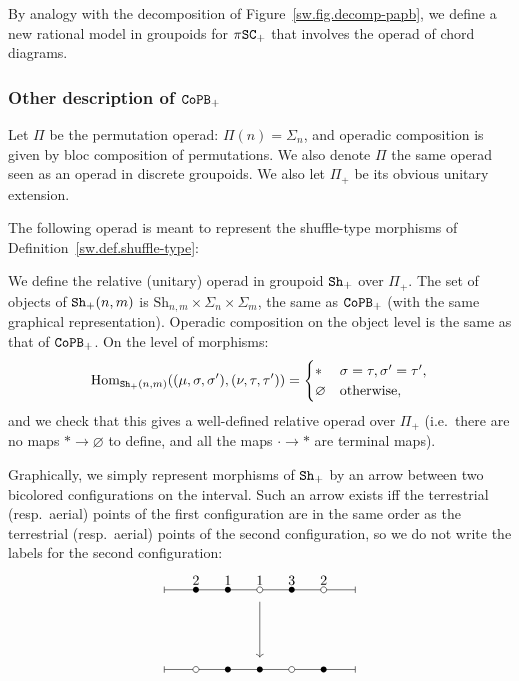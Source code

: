 By analogy with the decomposition of Figure~\ref{sw.fig.decomp-papb}, we define a new rational model in groupoids for $\pi \mathtt{SC}_{+}$ that involves the operad of chord diagrams.

\subsubsection{Other description of \texorpdfstring{$\mathtt{CoPB}_+$}{CoPB+}}
\label{sw.sec.other-descr-copb}

\begin{definition}
  Let $\Pi$ be the permutation operad: $\Pi(n) = \Sigma_{n}$, and operadic composition is given by bloc composition of permutations.
  We also denote $\Pi$ the same operad seen as an operad in discrete groupoids.
  We also let $\Pi_{+}$ be its obvious unitary extension.
\end{definition}

The following operad is meant to represent the shuffle-type morphisms of Definition~\ref{sw.def.shuffle-type}:

\begin{definition}
  We define the relative (unitary) operad in groupoid $\mathtt{Sh}_{+}$ over $\Pi_{+}$.
  The set of objects of $\mathtt{Sh}_+(n,m)$ is $\mathrm{Sh}_{n,m} \times \Sigma_{n} \times \Sigma_{m}$, the same as $\mathtt{CoPB}_{+}$ (with the same graphical representation).
  Operadic composition on the object level is the same as that of $\mathtt{CoPB}_{+}$.
  On the level of morphisms:
  \[ \operatorname{Hom}_{\mathtt{Sh}_{+}(n,m)}((\mu, \sigma, \sigma'), (\nu, \tau, \tau')) =
    \begin{cases}
      * & \sigma = \tau, \sigma' = \tau', \\
      \varnothing & \text{otherwise},
    \end{cases}
  \]
  and we check that this gives a well-defined relative operad over $\Pi_{+}$ (i.e.\ there are no maps $* \to \varnothing$ to define, and all the maps $\cdot \to *$ are terminal maps).
\end{definition}

Graphically, we simply represent morphisms of $\mathtt{Sh}_{+}$ by an arrow between two bicolored configurations on the interval.
Such an arrow exists iff the terrestrial (resp.\ aerial) points of the first configuration are in the same order as the terrestrial (resp.\ aerial) points of the second configuration, so we do not write the labels for the second configuration:
\[ \begin{tikzpicture}[xscale=0.8]
    \draw[|-|] (0,0) -- (6,0);
    \bdot{1,0}{2};
    \bdot{2,0}{1};
    \wdot{3,0}{1};
    \bdot{4,0}{3};
    \wdot{5,0}{2};
    \draw[|-|] (0,-2) -- (6,-2);
    \wdot{1,-2}{};
    \bdot{2,-2}{};
    \bdot{3,-2}{};
    \wdot{4,-2}{};
    \bdot{5,-2}{};
    \draw[->] (3,-0.3) -- (3,-1.7);
\end{tikzpicture} \]

